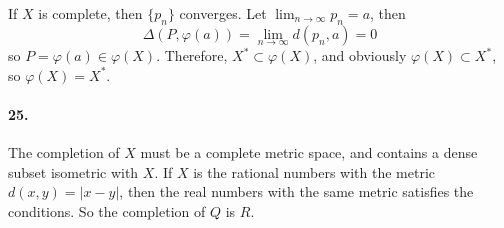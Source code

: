 \documentclass[a4paper]{article}
\begin{document}
If $X$ is complete, then $\{p_n\}$ converges. Let $\lim_{n\to\infty}p_n=a$, then
\[
\Delta(P,\varphi(a))=\lim_{n\to\infty}d(p_n,a)=0
\]
so $P=\varphi(a)\in\varphi(X)$. Therefore, $X^*\subset\varphi(X)$, and obviously $\varphi(X)\subset X^*$, so $\varphi(X)=X^*$.

\paragraph{25.}
The completion of $X$ must be a complete metric space, and contains a dense subset isometric with $X$. If $X$ is the rational numbers with the metric $d(x,y)=|x-y|$, then the real numbers with the same metric satisfies the conditions. So the completion of $Q$ is $R$.
\end{document}
